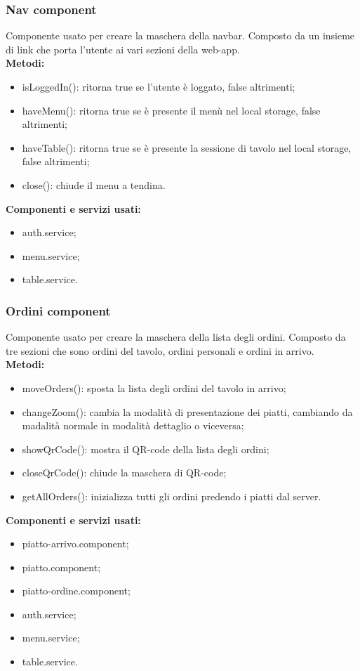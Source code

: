 \subsubsection{Nav component}
Componente usato per creare la maschera della navbar. Composto da un insieme di link che porta l'utente ai vari sezioni della web-app.\\
\textbf{Metodi:}
\begin{itemize}
    \item isLoggedIn(): ritorna true se l'utente è loggato, false altrimenti;
    \item haveMenu(): ritorna true se è presente il menù nel local storage, false altrimenti;
    \item haveTable(): ritorna true se è presente la sessione di tavolo nel local storage, false altrimenti;
    \item close(): chiude il menu a tendina.
\end{itemize}
\textbf{Componenti e servizi usati:}
\begin{itemize}    
    \item auth.service;
    \item menu.service;
    \item table.service.
\end{itemize}

\subsubsection{Ordini component}
Componente usato per creare la maschera della lista degli ordini. Composto da tre sezioni che sono ordini del tavolo, ordini personali e ordini in arrivo.\\
\textbf{Metodi:}
\begin{itemize}
    \item moveOrders(): sposta la lista degli ordini del tavolo in arrivo;
    \item changeZoom(): cambia la modalità di presentazione dei piatti, cambiando da madalità normale in modalità dettaglio o viceversa;
    \item showQrCode(): mostra il QR-code della lista degli ordini;
    \item closeQrCode(): chiude la maschera di QR-code;
    \item getAllOrders(): inizializza tutti gli ordini predendo i piatti dal server.
\end{itemize}
\textbf{Componenti e servizi usati:}
\begin{itemize}
    \item piatto-arrivo.component;
    \item piatto.component;
    \item piatto-ordine.component;
    \item auth.service;
    \item menu.service;
    \item table.service.
\end{itemize}

